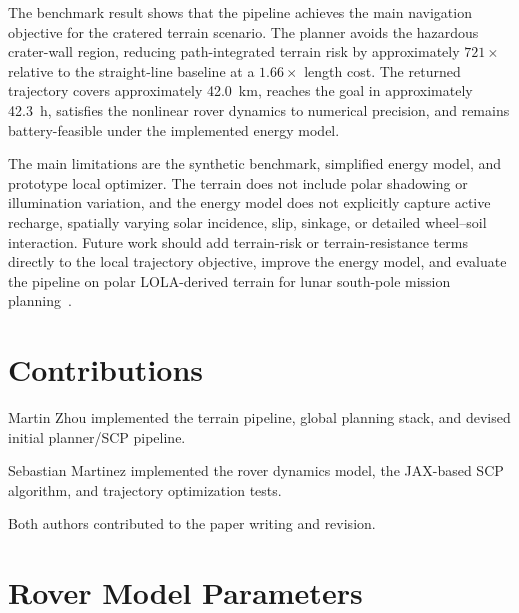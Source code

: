 \documentclass[conf]{new-aiaa}
\begin{document}
The benchmark result shows that the pipeline achieves the main navigation objective for the cratered terrain scenario. The planner avoids the hazardous crater-wall region, reducing path-integrated terrain risk by approximately $721\times$ relative to the straight-line baseline at a $1.66\times$ length cost. The returned trajectory covers approximately \SI{42.0}{km}, reaches the goal in approximately \SI{42.3}{h}, satisfies the nonlinear rover dynamics to numerical precision, and remains battery-feasible under the implemented energy model.

The main limitations are the synthetic benchmark, simplified energy model, and prototype local optimizer. The terrain does not include polar shadowing or illumination variation, and the energy model does not explicitly capture active recharge, spatially varying solar incidence, slip, sinkage, or detailed wheel--soil interaction. Future work should add terrain-risk or terrain-resistance terms directly to the local trajectory objective, improve the energy model, and evaluate the pipeline on polar LOLA-derived terrain for lunar south-pole mission planning~\cite{nasa_lola,moon_sokolov}.

\section{Contributions}
Martin Zhou implemented the terrain pipeline, global planning stack, and devised initial planner/SCP pipeline.

Sebastian Martinez implemented the rover dynamics model, the JAX-based SCP algorithm, and trajectory optimization tests.

Both authors contributed to the paper writing and revision.



\appendix
\section{Rover Model Parameters}
\end{document}

